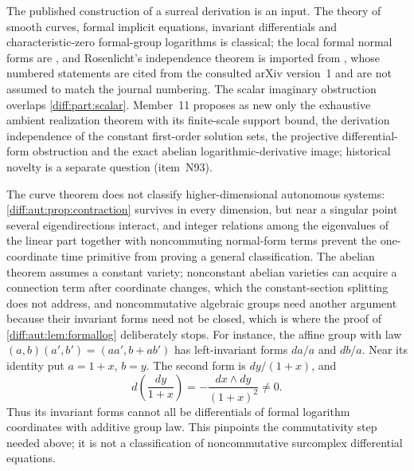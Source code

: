 \documentclass[11pt,letterpaper]{article}
\numberwithin{equation}{section}
\theoremstyle{definition}
\theoremstyle{remark}
\begin{document}
\begin{remark}
\label{diff:aut:rem:inputs}
The published construction of a surreal derivation is an input. The theory of
smooth curves, formal implicit equations, invariant differentials and
characteristic-zero formal-group logarithms is classical; the local formal normal
forms are \cite[Lemma~6.1]{NPT}, and Rosenlicht's independence theorem is imported
from \cite[Lemma~7.2, Proposition~7.3]{NPT}, whose numbered statements are cited
from the consulted arXiv version~1 and are not assumed to match the journal
numbering. The scalar imaginary obstruction overlaps \cref{diff:part:scalar}.
Member~11 proposes as new only the exhaustive ambient realization theorem with its
finite-scale support bound, the derivation independence of the constant
first-order solution sets, the projective differential-form obstruction and the
exact abelian logarithmic-derivative image; historical novelty is a separate
question (item~N93).
\end{remark}

\begin{remark}[Boundaries]
\label{diff:aut:rem:boundaries}
The curve theorem does not classify higher-dimensional autonomous systems:
\cref{diff:aut:prop:contraction} survives in every dimension, but near a singular
point several eigendirections interact, and integer relations among the
eigenvalues of the linear part together with noncommuting normal-form terms
prevent the one-coordinate time primitive from proving a
general classification. The abelian theorem assumes a constant variety;
nonconstant abelian varieties can acquire a connection term after coordinate
changes, which the constant-section splitting does not address, and
noncommutative algebraic groups need another argument because their invariant
forms need not be closed, which is where the proof of
\cref{diff:aut:lem:formallog} deliberately stops.
For instance, the affine group with law
$(a,b)(a',b')=(aa',b+ab')$ has left-invariant forms
$da/a$ and $db/a$. Near its identity put $a=1+x$, $b=y$.
The second form is $dy/(1+x)$, and
\[
 d\!\left(\frac{dy}{1+x}\right)
 =-\frac{dx\wedge dy}{(1+x)^2}\neq0.
\]
Thus its invariant forms cannot all be differentials of formal
logarithm coordinates with additive group law. This pinpoints the
commutativity step needed above; it is not a classification of
noncommutative surcomplex differential equations.
\end{remark}
\end{document}
